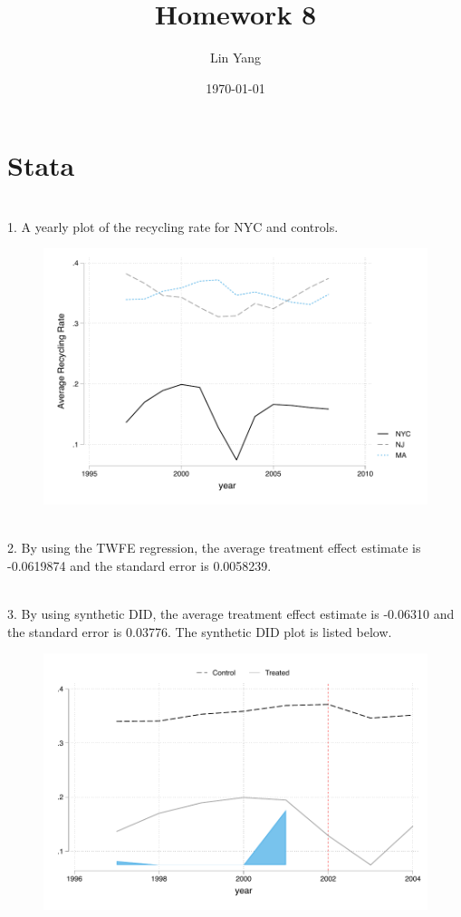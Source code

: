 \documentclass{article}
\title{Homework 8}
\author{Lin Yang}
\date{\today}
\begin{document}
\maketitle  
\section{Stata}
~\\
1. A yearly plot of the recycling rate for NYC and controls. 
\begin{figure}[H]
\centering
\includegraphics[scale = 0.9]{q1.pdf}
	
\end{figure}

~\\
2. By using the TWFE regression, the average treatment effect estimate is -0.0619874 and the standard error is 0.0058239.  


~\\
3. By using synthetic DID, the average treatment effect estimate is -0.06310 and the standard error is  0.03776. The synthetic DID plot is listed below. 
\begin{figure}[H]
\centering
\includegraphics[scale = 0.9]{q3.pdf}
	
\end{figure}
\end{document}
